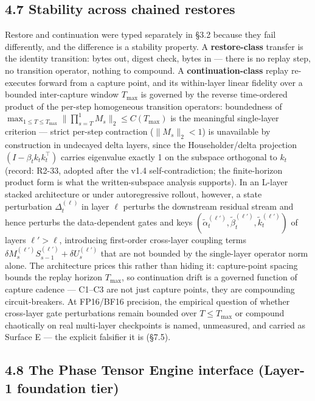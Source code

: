 \documentclass[11pt]{article}
\begin{document}
\subsection{4.7 Stability across chained restores}\label{stability-across-chained-restores}

Restore and continuation were typed separately in \S{}3.2 because they fail differently, and the difference is a stability property. A \textbf{restore-class} transfer is the identity transition: bytes out, digest check, bytes in --- there is no replay step, no transition operator, nothing to compound. A \textbf{continuation-class} replay re-executes forward from a capture point, and its within-layer linear fidelity over a bounded inter-capture window \(T_{\max}\) is governed by the reverse time-ordered product of the per-step homogeneous transition operators: boundedness of \(\max_{1\leq T\leq T_{\max}} \lVert\prod_{s=T}^{1} M_s\rVert_2 \leq C(T_{\max})\) is the meaningful single-layer criterion --- strict per-step contraction (\(\lVert M_s\rVert_2 < 1\)) is unavailable by construction in undecayed delta layers, since the Householder/delta projection \((I - \beta_t k_t k_t^{\top})\) carries eigenvalue exactly 1 on the subspace orthogonal to \(k_t\) (record: R2-33, adopted after the v1.4 self-contradiction; the finite-horizon product form is what the written-subspace analysis supports). In an L-layer stacked architecture or under autoregressive rollout, however, a state perturbation \(\Delta_t^{(\ell)}\) in layer \(\ell\) perturbs the downstream residual stream and hence perturbs the data-dependent gates and keys \((\tilde{\alpha}_t^{(\ell')}, \tilde{\beta}_t^{(\ell')}, \tilde{k}_t^{(\ell')})\) of layers \(\ell' > \ell\), introducing first-order cross-layer coupling terms \(\delta M_s^{(\ell')} S_{s-1}^{(\ell')} + \delta U_s^{(\ell')}\) that are not bounded by the single-layer operator norm alone. The architecture prices this rather than hiding it: capture-point spacing bounds the replay horizon \(T_{\max}\), so continuation drift is a governed function of capture cadence --- C1--C3 are not just capture points, they are compounding circuit-breakers. At FP16/BF16 precision, the empirical question of whether cross-layer gate perturbations remain bounded over \(T \leq T_{\max}\) or compound chaotically on real multi-layer checkpoints is named, unmeasured, and carried as Surface E --- the explicit falsifier it is (\S{}7.5).

\subsection{4.8 The Phase Tensor Engine interface (Layer-1 foundation tier)}\label{the-phase-tensor-engine-interface-layer-1-foundation-tier}
\end{document}
